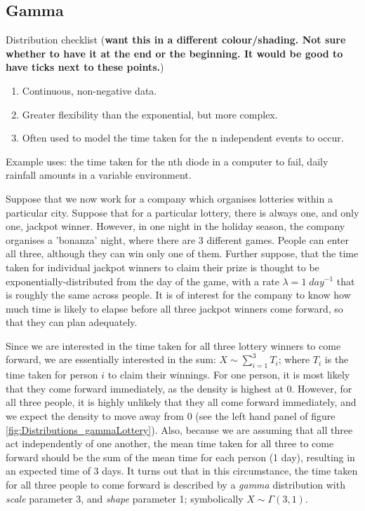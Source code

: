\documentclass[11pt,fullpage]{book}
\begin{document}
\subsection{Gamma}
Distribution checklist (\textbf{want this in a different colour/shading. Not sure whether to have it at the end or the beginning. It would be good to have ticks next to these points.})

\begin{enumerate} 
\item Continuous, non-negative data.
\item Greater flexibility than the exponential, but more complex.
\item Often used to model the time taken for the n independent events to occur.
\end{enumerate}

Example uses: the time taken for the nth diode in a computer to fail, daily rainfall amounts in a variable environment.

Suppose that we now work for a company which organises lotteries within a particular city. Suppose that for a particular lottery, there is always one, and only one, jackpot winner. However, in one night in the holiday season, the company organises a 'bonanza' night, where there are 3 different games. People can enter all three, although they can win only one of them. Further suppose, that the time taken for individual jackpot winners to claim their prize is thought to be exponentially-distributed from the day of the game, with a rate $\lambda=1\; day^{-1}$  that is roughly the same across people. It is of interest for the company to know how much time is likely to elapse before all three jackpot winners come forward, so that they can plan adequately. 

Since we are interested in the time taken for all three lottery winners to come forward, we are essentially interested in the sum: $X\sim \sum\limits_{i=1}^{3} T_i$; where $T_i$ is the time taken for person $i$ to claim their winnings. For one person, it is most likely that they come forward immediately, as the density is highest at 0. However, for all three people, it is highly unlikely that they all come forward immediately, and we expect the density to move away from 0 (see the left hand panel of figure \ref{fig:Distributions_gammaLottery}). Also, because we are assuming that all three act independently of one another, the mean time taken for all three to come forward should be the sum of the mean time for each person (1 day), resulting in an expected time of 3 days. It turns out that in this circumstance, the time taken for all three people to come forward is described by a \textit{gamma} distribution with \textit{scale} parameter 3, and \textit{shape} parameter 1; symbolically $X\sim \Gamma(3,1)$. 
\end{document}
